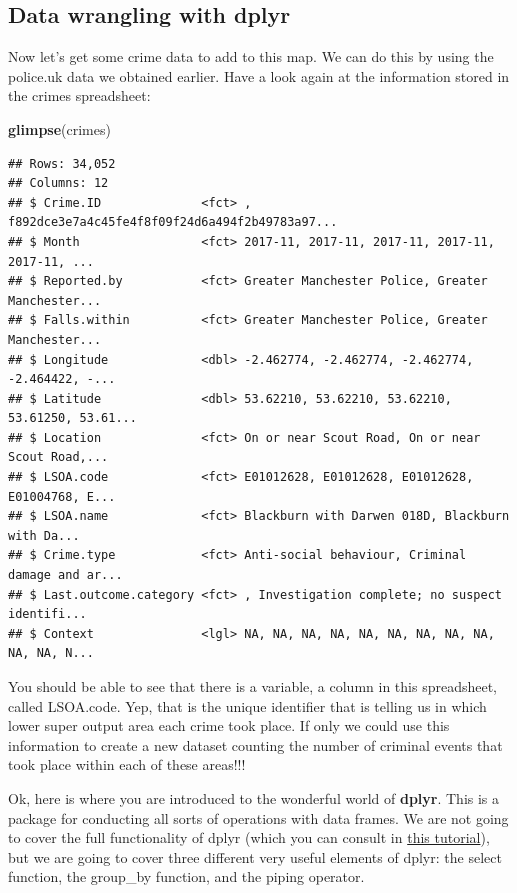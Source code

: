 \documentclass[]{book}
\newenvironment{Shaded}{\begin{snugshade}}{\end{snugshade}}
\newcommand{\KeywordTok}[1]{\textcolor[rgb]{0.13,0.29,0.53}{\textbf{#1}}}
\newcommand{\NormalTok}[1]{#1}
\begin{document}
\hypertarget{data-wrangling-with-dplyr}{%
\subsection{Data wrangling with dplyr}\label{data-wrangling-with-dplyr}}

Now let's get some crime data to add to this map. We can do this by using the police.uk data we obtained earlier. Have a look again at the information stored in the crimes spreadsheet:

\begin{Shaded}
\begin{Highlighting}[]
\KeywordTok{glimpse}\NormalTok{(crimes)}
\end{Highlighting}
\end{Shaded}

\begin{verbatim}
## Rows: 34,052
## Columns: 12
## $ Crime.ID              <fct> , f892dce3e7a4c45fe4f8f09f24d6a494f2b49783a97...
## $ Month                 <fct> 2017-11, 2017-11, 2017-11, 2017-11, 2017-11, ...
## $ Reported.by           <fct> Greater Manchester Police, Greater Manchester...
## $ Falls.within          <fct> Greater Manchester Police, Greater Manchester...
## $ Longitude             <dbl> -2.462774, -2.462774, -2.462774, -2.464422, -...
## $ Latitude              <dbl> 53.62210, 53.62210, 53.62210, 53.61250, 53.61...
## $ Location              <fct> On or near Scout Road, On or near Scout Road,...
## $ LSOA.code             <fct> E01012628, E01012628, E01012628, E01004768, E...
## $ LSOA.name             <fct> Blackburn with Darwen 018D, Blackburn with Da...
## $ Crime.type            <fct> Anti-social behaviour, Criminal damage and ar...
## $ Last.outcome.category <fct> , Investigation complete; no suspect identifi...
## $ Context               <lgl> NA, NA, NA, NA, NA, NA, NA, NA, NA, NA, NA, N...
\end{verbatim}

You should be able to see that there is a variable, a column in this spreadsheet, called LSOA.code. Yep, that is the unique identifier that is telling us in which lower super output area each crime took place. If only we could use this information to create a new dataset counting the number of criminal events that took place within each of these areas!!!

Ok, here is where you are introduced to the wonderful world of \textbf{dplyr}. This is a package for conducting all sorts of operations with data frames. We are not going to cover the full functionality of dplyr (which you can consult in \href{https://cran.r-project.org/web/packages/dplyr/vignettes/dplyr.html}{this tutorial}), but we are going to cover three different very useful elements of dplyr: the select function, the group\_by function, and the piping operator.
\end{document}
